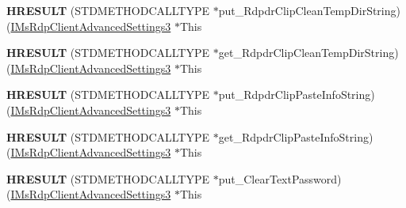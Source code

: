 \begin{DoxyCompactItemize}
\item 
\mbox{\label{struct_m_s_t_s_c_lib_1_1_i_ms_rdp_client_advanced_settings3_vtbl_a0456289100c79f2fda3bc448a33ab1c8}} 
{\bfseries H\+R\+E\+S\+U\+LT} (S\+T\+D\+M\+E\+T\+H\+O\+D\+C\+A\+L\+L\+T\+Y\+PE $\ast$put\+\_\+\+Rdpdr\+Clip\+Clean\+Temp\+Dir\+String)(\hyperlink{interface_m_s_t_s_c_lib_1_1_i_ms_rdp_client_advanced_settings3}{I\+Ms\+Rdp\+Client\+Advanced\+Settings3} $\ast$This
\item 
\mbox{\label{struct_m_s_t_s_c_lib_1_1_i_ms_rdp_client_advanced_settings3_vtbl_a7a9cea2daae334a0992a5586aa3a24a0}} 
{\bfseries H\+R\+E\+S\+U\+LT} (S\+T\+D\+M\+E\+T\+H\+O\+D\+C\+A\+L\+L\+T\+Y\+PE $\ast$get\+\_\+\+Rdpdr\+Clip\+Clean\+Temp\+Dir\+String)(\hyperlink{interface_m_s_t_s_c_lib_1_1_i_ms_rdp_client_advanced_settings3}{I\+Ms\+Rdp\+Client\+Advanced\+Settings3} $\ast$This
\item 
\mbox{\label{struct_m_s_t_s_c_lib_1_1_i_ms_rdp_client_advanced_settings3_vtbl_a11ed7db283eaae5151a34ecc9b94726c}} 
{\bfseries H\+R\+E\+S\+U\+LT} (S\+T\+D\+M\+E\+T\+H\+O\+D\+C\+A\+L\+L\+T\+Y\+PE $\ast$put\+\_\+\+Rdpdr\+Clip\+Paste\+Info\+String)(\hyperlink{interface_m_s_t_s_c_lib_1_1_i_ms_rdp_client_advanced_settings3}{I\+Ms\+Rdp\+Client\+Advanced\+Settings3} $\ast$This
\item 
\mbox{\label{struct_m_s_t_s_c_lib_1_1_i_ms_rdp_client_advanced_settings3_vtbl_a7943cd94762136b5ed34532708d1aab1}} 
{\bfseries H\+R\+E\+S\+U\+LT} (S\+T\+D\+M\+E\+T\+H\+O\+D\+C\+A\+L\+L\+T\+Y\+PE $\ast$get\+\_\+\+Rdpdr\+Clip\+Paste\+Info\+String)(\hyperlink{interface_m_s_t_s_c_lib_1_1_i_ms_rdp_client_advanced_settings3}{I\+Ms\+Rdp\+Client\+Advanced\+Settings3} $\ast$This
\item 
\mbox{\label{struct_m_s_t_s_c_lib_1_1_i_ms_rdp_client_advanced_settings3_vtbl_ade481830ed227526666cd31e8e12884f}} 
{\bfseries H\+R\+E\+S\+U\+LT} (S\+T\+D\+M\+E\+T\+H\+O\+D\+C\+A\+L\+L\+T\+Y\+PE $\ast$put\+\_\+\+Clear\+Text\+Password)(\hyperlink{interface_m_s_t_s_c_lib_1_1_i_ms_rdp_client_advanced_settings3}{I\+Ms\+Rdp\+Client\+Advanced\+Settings3} $\ast$This

\end{DoxyCompactItemize}
